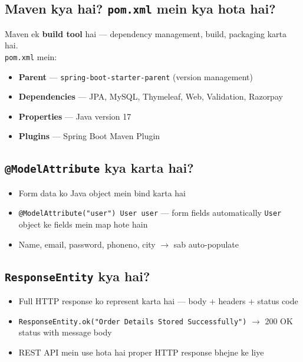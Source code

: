 \documentclass[12pt,a4paper]{article}
\begin{document}
\subsection{Maven kya hai? \texttt{pom.xml} mein kya hota hai?}

\begin{answerbox}
Maven ek \textbf{build tool} hai --- dependency management, build, packaging karta hai.\\[5pt]
\texttt{pom.xml} mein:
\begin{itemize}
    \item \textbf{Parent} --- \texttt{spring-boot-starter-parent} (version management)
    \item \textbf{Dependencies} --- JPA, MySQL, Thymeleaf, Web, Validation, Razorpay
    \item \textbf{Properties} --- Java version 17
    \item \textbf{Plugins} --- Spring Boot Maven Plugin
\end{itemize}
\end{answerbox}

\subsection{\texttt{@ModelAttribute} kya karta hai?}

\begin{answerbox}
\begin{itemize}
    \item Form data ko Java object mein bind karta hai
    \item \texttt{@ModelAttribute("user") User user} --- form fields automatically \texttt{User} object ke fields mein map hote hain
    \item Name, email, password, phoneno, city $\rightarrow$ sab auto-populate
\end{itemize}
\end{answerbox}

\subsection{\texttt{ResponseEntity} kya hai?}

\begin{answerbox}
\begin{itemize}
    \item Full HTTP response ko represent karta hai --- body + headers + status code
    \item \texttt{ResponseEntity.ok("Order Details Stored Successfully")} $\rightarrow$ 200 OK status with message body
    \item REST API mein use hota hai proper HTTP response bhejne ke liye
\end{itemize}
\end{answerbox}
\end{document}
